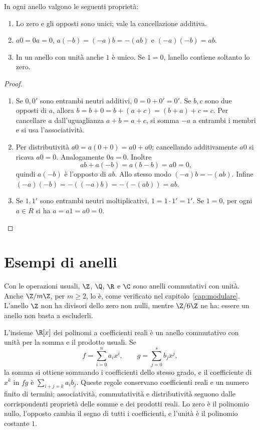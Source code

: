 \begin{proposizione}\label{prop:prime-anello}
In ogni anello valgono le seguenti proprietà:
\begin{enumerate}[label=\arabic*.]
\item Lo zero e gli opposti sono unici; vale la cancellazione additiva.
\item $a0=0a=0$, $a(-b)=(-a)b=-(ab)$ e $(-a)(-b)=ab$.
\item In un anello con unità anche $1$ è unico. Se $1=0$, l\textquotesingle anello contiene soltanto lo zero.
\end{enumerate}
\end{proposizione}
\begin{proof}
\begin{enumerate}[label=\arabic*.]
\item Se $0,0'$ sono entrambi neutri additivi, $0=0+0'=0'$. Se $b,c$ sono due opposti di $a$, allora $b=b+0=b+(a+c)=(b+a)+c=c$. Per cancellare $a$ dall'uguaglianza $a+b=a+c$, si somma $-a$ a entrambi i membri e si usa l'associatività.
\item Per distributività $a0=a(0+0)=a0+a0$; cancellando additivamente $a0$ si ricava $a0=0$. Analogamente $0a=0$. Inoltre
\[
ab+a(-b)=a(b-b)=a0=0,
\]
quindi $a(-b)$ è l'opposto di $ab$. Allo stesso modo $(-a)b=-(ab)$. Infine $(-a)(-b)=-((-a)b)=-(-(ab))=ab$.
\item Se $1,1'$ sono entrambi neutri moltiplicativi, $1=1\cdot1'=1'$. Se $1=0$, per ogni $a\in R$ si ha $a=a1=a0=0$.
\end{enumerate}
\end{proof}

\section{Esempi di anelli}
\begin{esempio}
Con le operazioni usuali, $\Z$, $\Q$, $\R$ e $\C$ sono anelli commutativi con unità. Anche $\Z/m\Z$, per $m\ge2$, lo è, come verificato nel capitolo~\ref{cap:modulare}. L'anello $\Z$ non ha divisori dello zero non nulli, mentre $\Z/6\Z$ ne ha: essere un anello non basta a escluderli.
\end{esempio}

\begin{esempio}
L'insieme $\R[x]$ dei polinomi a coefficienti reali è un anello commutativo con unità per la somma e il prodotto usuali. Se
\[
f=\sum_{i=0}^n a_ix^i,\qquad g=\sum_{j=0}^s b_jx^j,
\]
la somma si ottiene sommando i coefficienti dello stesso grado, e il coefficiente di $x^k$ in $fg$ è $\sum_{i+j=k}a_ib_j$. Queste regole conservano coefficienti reali e un numero finito di termini; associatività, commutatività e distributività seguono dalle corrispondenti proprietà delle somme e dei prodotti reali. Lo zero è il polinomio nullo, l'opposto cambia il segno di tutti i coefficienti, e l'unità è il polinomio costante $1$.
\end{esempio}

